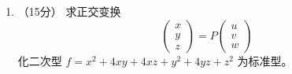 \begin{enumerate}[1~]
\begin{solution}
\[\begin{array}{c}
	\boldsymbol{\alpha} _3\\
\end{array} \right)^{-1} =\left( \begin{matrix}
	-5&		0&		3\\
	0&		-1&		6\\
	-5&		-1&		9\\
\end{matrix} \right) \left( \begin{matrix}
	-1&		0&		2\\
	0&		1&		1\\
	3&		-1&		0\\
\end{matrix} \right)^{-1} =\left(
\begin{array}{ccc}
 2 & -1 & -1 \\
 3 & 0 & 1 \\
 5 & -1 & 0 \\
\end{array}
\right).
\]
所以$\mathscr{A}$在基$\boldsymbol{\alpha} _ { 1 } ,  \boldsymbol{\alpha} _ { 2 } ,  \boldsymbol{\alpha} _ { 3 }$下的矩阵$A$为$\left(
\begin{array}{ccc}
 2 & -1 & -1 \\
 3 & 0 & 1 \\
 5 & -1 & 0 \\
\end{array}
\right)$。
\end{solution}

\item[三、]（15分）
求正交变换 
$$
\left( \begin{array} { l } { x } \\ { y } \\ { z } \end{array} \right) = P \left( \begin{array} { l } { u } \\ { v } \\ { w } \end{array} \right)
$$
化二次型 $f = x ^ { 2 } + 4 x y + 4 x z + y ^ { 2 } + 4 y z + z ^ { 2 }$ 为标准型。


\end{enumerate}
